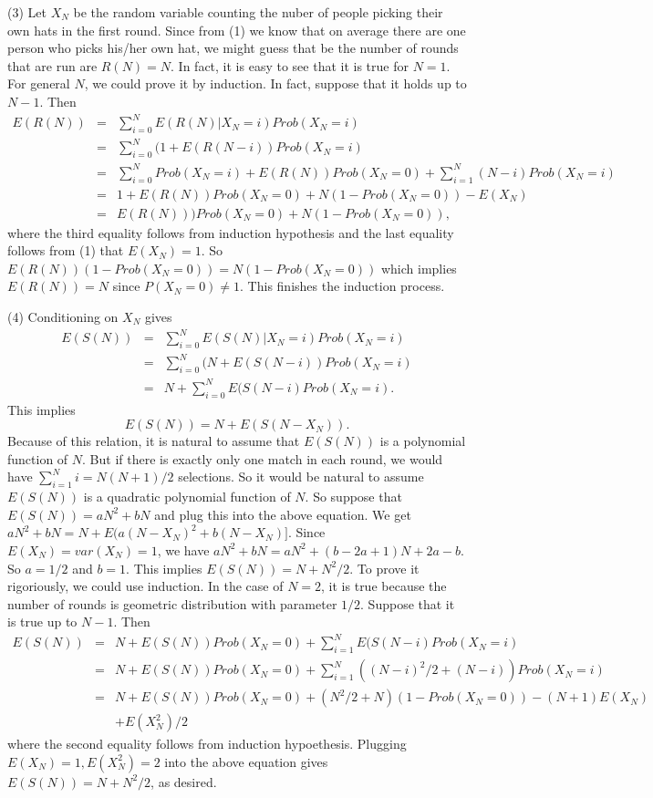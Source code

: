 \documentclass[12pt]{amsart}
\begin{document}
(3) Let $X_N$ be the random variable counting the nuber of people picking their own hats in the first round. Since from (1) we know that on average there are one person who picks his/her own hat, we might guess that be the number of rounds that are run are $R(N)=N$. In fact, it is easy to see that it is true for $N=1$. For general $N$, we could prove it by induction. In fact, suppose that it holds up to $N-1$. Then
\begin{eqnarray*}
E(R(N))&=&\sum_{i=0}^NE(R(N)|X_N=i)Prob(X_N=i)\\
&=&\sum_{i=0}^N(1+E(R(N-i))Prob(X_N=i)\\
&=&\sum_{i=0}^NProb(X_N=i)+E(R(N))Prob(X_N=0)+\sum_{i=1}^N(N-i)Prob(X_N=i)\\
&=&1+E(R(N))Prob(X_N=0)+N(1-Prob(X_N=0))-E(X_N)\\
&=&E(R(N)))Prob(X_N=0)+N(1-Prob(X_N=0)),
\end{eqnarray*}
where the third equality follows from induction hypothesis and the last equality follows from (1) that $E(X_N)=1$. So $E(R(N))(1-Prob(X_N=0))=N(1-Prob(X_N=0))$ which implies $E(R(N))=N$ since $P(X_N=0)\neq1$. This finishes the induction process.

(4)  Conditioning on $X_N$ gives
\begin{eqnarray*}
E(S(N))&=&\sum_{i=0}^NE(S(N)|X_N=i)Prob(X_N=i)\\
&=&\sum_{i=0}^N(N+E(S(N-i))Prob(X_N=i)\\
&=&N+\sum_{i=0}^NE(S(N-i)Prob(X_N=i).
\end{eqnarray*}
This implies $$E(S(N))=N+E(S(N-X_N)).$$ Because of this relation, it is natural to assume that $E(S(N))$ is a polynomial function of $N$. But if there is exactly only one match in each round, we would have $\sum_{i=1}^Ni=N(N+1)/2$  selections. So it would be natural to assume $E(S(N))$ is a quadratic polynomial function of $N$. So suppose that $E(S(N))= aN^2+bN$ and plug this into the above equation. We get 
$aN^2+bN=N+E(a(N-X_N)^2+b(N-X_N)]$. Since $E(X_N)=var(X_N)=1$, we have $aN^2+bN=aN^2+(b-2a+1)N+2a-b$. So $a=1/2$ and $b=1$. This implies $E(S(N))=N+N^2/2$. To prove it rigoriously, we could use induction. In the case of $N=2$, it is true because the number of rounds is geometric distribution with parameter $1/2$. Suppose that it is true up to $N-1$. Then
\begin{eqnarray*}
E(S(N))&=&N+E(S(N))Prob(X_N=0)+\sum_{i=1}^NE(S(N-i)Prob(X_N=i)\\
&=&N+E(S(N))Prob(X_N=0)+\sum_{i=1}^N((N-i)^2/2+(N-i))Prob(X_N=i)\\
&=&N+E(S(N))Prob(X_N=0)+(N^2/2+N)(1-Prob(X_N=0))-(N+1)E(X_N)\\
& &+E(X_N^2)/2
\end{eqnarray*}
where the second equality follows from induction hypoethesis. Plugging $E(X_N)=1,E(X_N^2)=2$ into the above equation gives $E(S(N))=N+N^2/2$, as desired.
\end{document}
